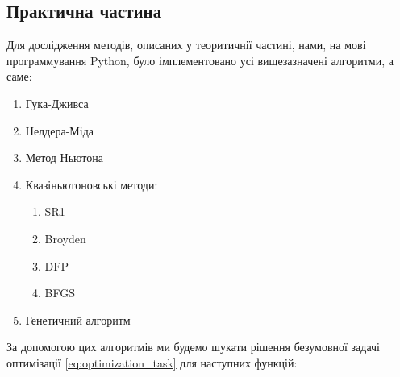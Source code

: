 \begin{center}
    \section*{Практична частина}
\end{center}

Для дослідження методів, описаних у теоритичнії
частині, нами, на мові программування Python, було імплементовано усі вищезазначені алгоритми,
а саме:
\vspace{0.25cm}
\begin{enumerate}
    \item Гука-Дживса
    \item Нелдера-Міда
    \item Метод Ньютона
    \item Квазіньютоновські методи:
    \begin{enumerate}
        \item SR1
        \item Broyden
        \item DFP
        \item BFGS
    \end{enumerate}
    \item Генетичний алгоритм
\end{enumerate}

За допомогою цих алгоритмів ми будемо шукати
рішення безумовної задачі оптимізації \ref{eq:optimization_task}
для наступних функцій:

